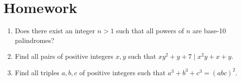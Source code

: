 \documentclass{article}
\begin{document}
\section{Homework}
  \begin{enumerate}
    \item Does there exist an integer $n>1$ such that all powers of $n$ are
      base-10 palindromes?
    \item Find all pairs of positive integers $x,y$ such that $xy^2+y+7\mid
      x^2y+x+y$.
    \item Find all triples $a,b,c$ of positive integers such that
      $a^3+b^3+c^3=(abc)^2$.
  \end{enumerate}
\end{document}

